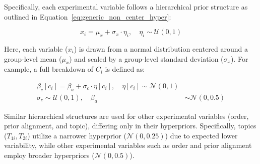 Specifically, each experimental variable follows a hierarchical prior structure as outlined in Equation~\ref{eq:generic_non_center_hyper}:

\begin{equation}
    \label{eq:generic_non_center_hyper}
    x_i = \mu_x + \sigma_x \cdot \eta_i, \quad \eta_i \sim \mathcal{U}(0,1)
\end{equation}

Here, each variable ($x_i$) is drawn from a normal distribution centered around a group-level mean ($\mu_x$) and scaled by a group-level standard deviation ($\sigma_x$). For example, a full breakdown of $C_i$ is defined as: 

\begin{align}
    \label{eq:generic_non_center_hyper_C}
    \beta_c[c_i] = \beta_a + \sigma_c \cdot \eta[c_i], \quad \eta[c_i] \sim \mathcal{N}(0, 1)\\
    \sigma_c \sim \mathcal{U}(0,1), \quad \beta_a &\sim \mathcal{N}(0, 0.5)
\end{align}


Similar hierarchical structures are used for other experimental variables (order, prior alignment, and topic), differing only in their hyperpriors. Specifically, topics ($T_{1i}, T_{2i}$) utilize a narrower hyperprior ($\mathcal{N}(0,0.25)$) due to expected lower variability, while other experimental variables such as order and prior alignment employ broader hyperpriors ($\mathcal{N}(0,0.5)$).